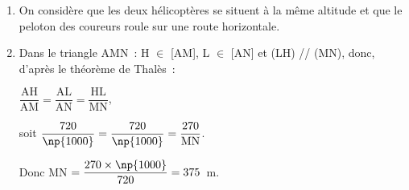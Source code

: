 
\medskip

%
%
%
%
%
%

\begin{enumerate}
\item %
On considère que les deux hélicoptères se situent à la même altitude et que le peloton des coureurs roule sur une route horizontale.
\item  %
Dans le triangle AMN :	H $\in$ [AM], L $\in$ [AN] et (LH) // (MN), donc, d'après le théorème de Thalès :  

$\dfrac{\text{AH}}{\text{AM}}= \dfrac{\text{AL}}{\text{AN}} = \dfrac{\text{HL}}{\text{MN}}$, 

soit  $\dfrac{720}{\np{1000}}  =\dfrac{720}{\np{1000}} = \dfrac{270}{\text{MN}}$.

Donc MN $= \dfrac{270 \times \np{1000}}{720} = 375$~m.
\end{enumerate}
 
\vspace{0,5cm}


